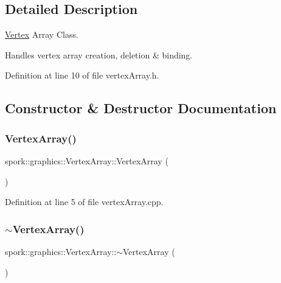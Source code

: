 \subsection{Detailed Description}
\hyperlink{structspork_1_1graphics_1_1_vertex}{Vertex} Array Class. 

Handles vertex array creation, deletion \& binding. 

Definition at line 10 of file vertex\+Array.\+h.



\subsection{Constructor \& Destructor Documentation}
\mbox{\label{classspork_1_1graphics_1_1_vertex_array_a13e593f72368d3de20f1204cf6e756dd}} 
\subsubsection{\texorpdfstring{Vertex\+Array()}{VertexArray()}}
{\footnotesize\ttfamily spork\+::graphics\+::\+Vertex\+Array\+::\+Vertex\+Array (\begin{DoxyParamCaption}{ }\end{DoxyParamCaption})}



Definition at line 5 of file vertex\+Array.\+cpp.

\mbox{\label{classspork_1_1graphics_1_1_vertex_array_a6e501bb3893c396e1ccf66720e5222ab}} 
\subsubsection{\texorpdfstring{$\sim$\+Vertex\+Array()}{~VertexArray()}}
{\footnotesize\ttfamily spork\+::graphics\+::\+Vertex\+Array\+::$\sim$\+Vertex\+Array (\begin{DoxyParamCaption}{ }\end{DoxyParamCaption})}



